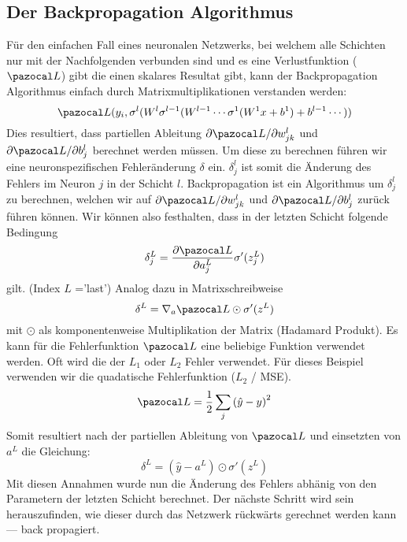 \subsection{Der Backpropagation Algorithmus}

Für den einfachen Fall eines neuronalen Netzwerks, bei welchem alle Schichten nur mit der Nachfolgenden verbunden sind und es eine Verlustfunktion ($\Lb$) gibt die einen skalares Resultat gibt, kann der Backpropagation Algorithmus einfach durch Matrixmultiplikationen verstanden werden:
\begin{equation}
\Lb(y_{i}, \sigma^{l}(W^{l}\sigma^{l-1}(W^{l-1}\cdots \sigma^{1}(W^{1}x+b^{1}) + b^{l-1} \cdots ) )
\end{equation}
Dies resultiert, dass partiellen Ableitung $\partial \Lb / \partial w^l_{jk}$ und $\partial \Lb / \partial b^l_j$ berechnet werden müssen. Um diese zu berechnen führen wir eine neuronspezifischen Fehleränderung $\delta$ ein. $\delta^{l}_{j}$ ist somit die Änderung des Fehlers im Neuron $j$ in der Schicht $l$. Backpropagation ist ein Algorithmus um $\delta^{l}_{j}$ zu berechnen, welchen wir auf $\partial \Lb / \partial w^l_{jk}$ und $\partial \Lb / \partial b^l_j$ zurück führen können. Wir können also festhalten, dass in der letzten Schicht folgende Bedingung
\begin{equation}
\delta^{L}_{j} = \frac{\partial \Lb}{\partial a^{L}_{j}} \sigma'(z^L_j)
\end{equation}
gilt. (Index $L$ ='last') Analog dazu in Matrixschreibweise
\begin{equation}
\delta^{L} = \nabla_a \Lb \odot \sigma'(z^L)
\end{equation}
mit $\odot$ als komponentenweise Multiplikation der Matrix (Hadamard Produkt). Es kann für die Fehlerfunktion $\Lb$ eine beliebige Funktion verwendet werden. Oft wird die der $L_1$ oder $L_2$ Fehler verwendet. Für dieses Beispiel verwenden wir die quadatische Fehlerfunktion ($L_2$ / MSE).
\begin{equation}
\Lb = \frac{1}{2} \sum_j \left( \hat{y} - y \right)^2
\end{equation}
Somit resultiert nach der partiellen Ableitung von $\Lb$ und einsetzten von $a^L$ die Gleichung:
\begin{equation}
\delta^{L} = (\hat{y} - a^L) \odot \sigma'(z^L)
\end{equation}
Mit diesen Annahmen wurde nun die Änderung des Fehlers abhänig von den Parametern der letzten Schicht berechnet. Der nächste Schritt wird sein herauszufinden, wie dieser durch das Netzwerk rückwärts gerechnet werden kann --- back propagiert.
